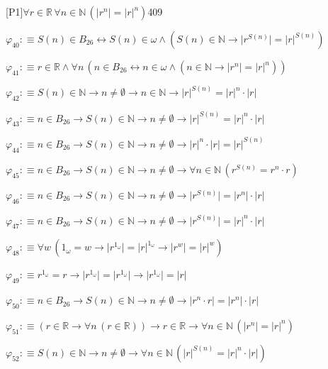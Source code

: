 \begin{fullproof}{[P1]}{$\forall r \in \mathbb{R}\,\forall n \in \mathbb{N}\,(\lvert {{r}^{n}} \rvert = {{\lvert r \rvert}^{n}})$}{409}
\begin{abbrevlist}
\item $\varphi_{40} :\equiv S(n) \in B_{26} \leftrightarrow S(n) \in \omega \land (S(n) \in \mathbb{N} \to \lvert {{r}^{S(n)}} \rvert = {{\lvert r \rvert}^{S(n)}})$
\item $\varphi_{41} :\equiv r \in \mathbb{R} \land \forall n\,(n \in B_{26} \leftrightarrow n \in \omega \land (n \in \mathbb{N} \to \lvert {{r}^{n}} \rvert = {{\lvert r \rvert}^{n}}))$
\item $\varphi_{42} :\equiv S(n) \in \mathbb{N} \to n \neq \emptyset \to n \in \mathbb{N} \to {{\lvert r \rvert}^{S(n)}} = {{\lvert r \rvert}^{n}} \cdot \lvert r \rvert$
\item $\varphi_{43} :\equiv n \in B_{26} \to S(n) \in \mathbb{N} \to n \neq \emptyset \to {{\lvert r \rvert}^{S(n)}} = {{\lvert r \rvert}^{n}} \cdot \lvert r \rvert$
\item $\varphi_{44} :\equiv n \in B_{26} \to S(n) \in \mathbb{N} \to n \neq \emptyset \to {{\lvert r \rvert}^{n}} \cdot \lvert r \rvert = {{\lvert r \rvert}^{S(n)}}$
\item $\varphi_{45} :\equiv n \in B_{26} \to S(n) \in \mathbb{N} \to n \neq \emptyset \to \forall n \in \mathbb{N}\,({{r}^{S(n)}} = {{r}^{n}} \cdot r)$
\item $\varphi_{46} :\equiv n \in B_{26} \to S(n) \in \mathbb{N} \to n \neq \emptyset \to \lvert {{r}^{S(n)}} \rvert = \lvert {{r}^{n}} \rvert \cdot \lvert r \rvert$
\item $\varphi_{47} :\equiv n \in B_{26} \to S(n) \in \mathbb{N} \to n \neq \emptyset \to \lvert {{r}^{S(n)}} \rvert = {{\lvert r \rvert}^{n}} \cdot \lvert r \rvert$
\item $\varphi_{48} :\equiv \forall w\,(1_{\omega} = w \to \lvert {{r}^{1_{\omega}}} \rvert = {{\lvert r \rvert}^{1_{\omega}}} \to \lvert {{r}^{w}} \rvert = {{\lvert r \rvert}^{w}})$
\item $\varphi_{49} :\equiv {{r}^{1_{\omega}}} = r \to \lvert {{r}^{1_{\omega}}} \rvert = \lvert {{r}^{1_{\omega}}} \rvert \to \lvert {{r}^{1_{\omega}}} \rvert = \lvert r \rvert$
\item $\varphi_{50} :\equiv n \in B_{26} \to S(n) \in \mathbb{N} \to n \neq \emptyset \to \lvert {{r}^{n}} \cdot r \rvert = \lvert {{r}^{n}} \rvert \cdot \lvert r \rvert$
\item $\varphi_{51} :\equiv (r \in \mathbb{R} \to \forall n\,(r \in \mathbb{R})) \to r \in \mathbb{R} \to \forall n \in \mathbb{N}\,(\lvert {{r}^{n}} \rvert = {{\lvert r \rvert}^{n}})$
\item $\varphi_{52} :\equiv S(n) \in \mathbb{N} \to n \neq \emptyset \to \forall n \in \mathbb{N}\,({{\lvert r \rvert}^{S(n)}} = {{\lvert r \rvert}^{n}} \cdot \lvert r \rvert)$

\end{abbrevlist}
\end{fullproof}
